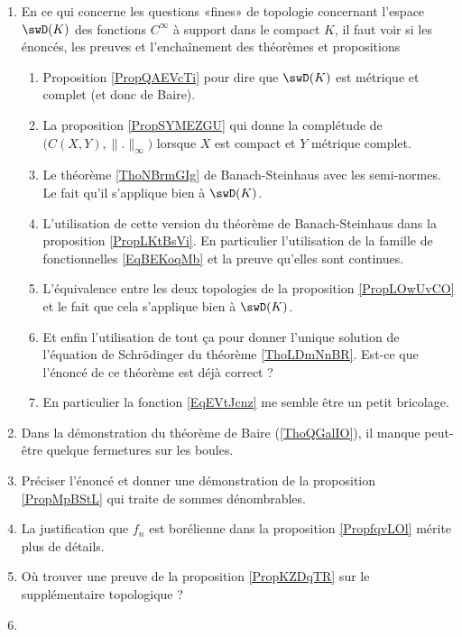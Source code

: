 \begin{enumerate}
        \item
            En ce qui concerne les questions «fines» de topologie concernant l'espace \( \swD(K)\) des fonctions \(  C^{\infty}\) à support dans le compact \( K\), il faut voir si les énoncés, les preuves et l'enchaînement des théorèmes et propositions
            \begin{enumerate}
                \item Proposition \ref{PropQAEVcTi} pour dire que \( \swD(K)\) est métrique et complet (et donc de Baire).
                \item La proposition \ref{PropSYMEZGU} qui donne la complétude de \( \big( C(X,Y),\| . \|_{\infty} \big)\) lorsque \( X\) est compact et \( Y\) métrique complet.
                \item Le théorème \ref{ThoNBrmGIg} de Banach-Steinhaus avec les semi-normes. Le fait qu'il s'applique bien à \( \swD(K)\).
                \item L'utilisation de cette version du théorème de Banach-Steinhaus dans la proposition \ref{PropLKtBsVi}. En particulier l'utilisation de la famille de fonctionnelles \eqref{EqBEKoqMb} et la preuve qu'elles sont continues.
                \item
                    L'équivalence entre les deux topologies de la proposition \ref{PropLOwUvCO} et le fait que cela s'applique bien à \( \swD(K)\).
                \item
                    Et enfin l'utilisation de tout ça pour donner l'unique solution de l'équation de Schrödinger du théorème \ref{ThoLDmNnBR}. Est-ce que l'énoncé de ce théorème est déjà correct ?
                \item
                    En particulier la fonction \eqref{EqEVtJcnz} me semble être un petit bricolage. 
            \end{enumerate}
    \item
        Dans la démonstration du théorème de Baire (\ref{ThoQGalIO}), il manque peut-être quelque fermetures sur les boules.
    \item
        Préciser l'énoncé et donner une démonstration de la proposition \ref{PropMpBStL} qui traite de sommes dénombrables.
    \item
        La justification que \( f_n\) est borélienne dans la proposition \ref{PropfqvLOl} mérite plus de détails.
    \item
        Où trouver une preuve de la proposition \ref{PropKZDqTR} sur le supplémentaire topologique ?
    \item

\end{enumerate}

